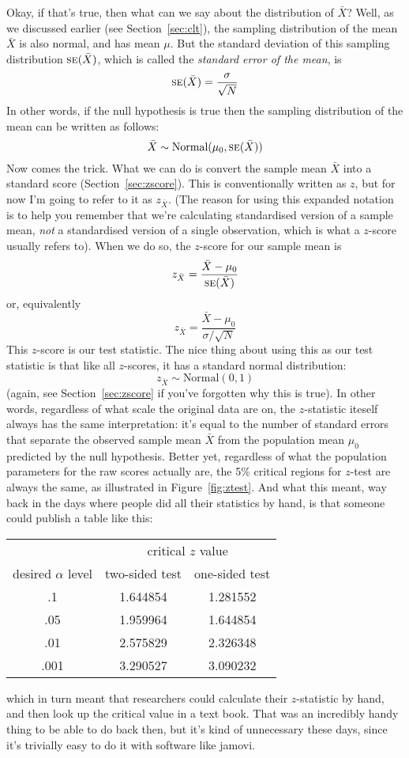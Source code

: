 \noindent
Okay, if that's true, then what can we say about the distribution of $\bar{X}$? Well, as we discussed earlier (see Section~\ref{sec:clt}), the sampling distribution of the mean $\bar{X}$ is also normal, and has mean $\mu$. But the standard deviation of this sampling distribution $\mbox{\textsc{se}}(\bar{X})$, which is called the {\it standard error of the mean}, is
$$
\mbox{\textsc{se}}(\bar{X}) = \frac{\sigma}{\sqrt{N}}
$$
In other words, if the null hypothesis is true then the sampling distribution of the mean can be written as follows:
$$
\bar{X} \sim \mbox{Normal}(\mu_0,\mbox{\textsc{se}}(\bar{X}))
$$
Now comes the trick. What we can do is convert the sample mean $\bar{X}$ into a standard score (Section~\ref{sec:zscore}). This is conventionally written as $z$, but for now I'm going to refer to it as $z_{\bar{X}}$. (The reason for using this expanded notation is to help you remember that we're calculating standardised version of a sample mean, {\it not} a standardised version of a single observation, which is what a $z$-score usually refers to). When we do so, the $z$-score for our sample mean is 
$$
z_{\bar{X}} = \frac{\bar{X} - \mu_0}{\mbox{\textsc{se}}(\bar{X})}
$$
or, equivalently
$$
z_{\bar{X}} =  \frac{\bar{X} - \mu_0}{\sigma / \sqrt{N}}
$$
This $z$-score is our test statistic. The nice thing about using this as our test statistic is that like all $z$-scores, it has a standard normal distribution:
$$
z_{\bar{X}} \sim \mbox{Normal}(0,1)
$$
(again, see Section~\ref{sec:zscore} if you've forgotten why this is true). In other words, regardless of what scale the original data are on, the $z$-statistic iteself always has the same interpretation: it's equal to the number of standard errors that separate the observed sample mean $\bar{X}$ from the population mean $\mu_0$ predicted by the null hypothesis. Better yet, regardless of what the population parameters for the raw scores actually are, the 5\% critical regions for $z$-test are always the same, as illustrated in Figure~\ref{fig:ztest}. And what this meant, way back in the days where people did all their statistics by hand, is that someone could publish a table like this:
\begin{center}
\begin{tabular}{c|cc}
& \multicolumn{2}{|c}{critical $z$ value} \\
desired $\alpha$ level & two-sided test & one-sided test \\ \hline
.1  &  1.644854 & 1.281552 \\
.05 &  1.959964 & 1.644854 \\
.01 &  2.575829 & 2.326348 \\
.001&  3.290527 & 3.090232 \\
\end{tabular}
\end{center}
which in turn meant that researchers could calculate their $z$-statistic by hand, and then look up the critical value in a text book.  That was an incredibly handy thing to be able to do back then, but it's kind of unnecessary these days, since it's trivially easy to do it with software like jamovi.


